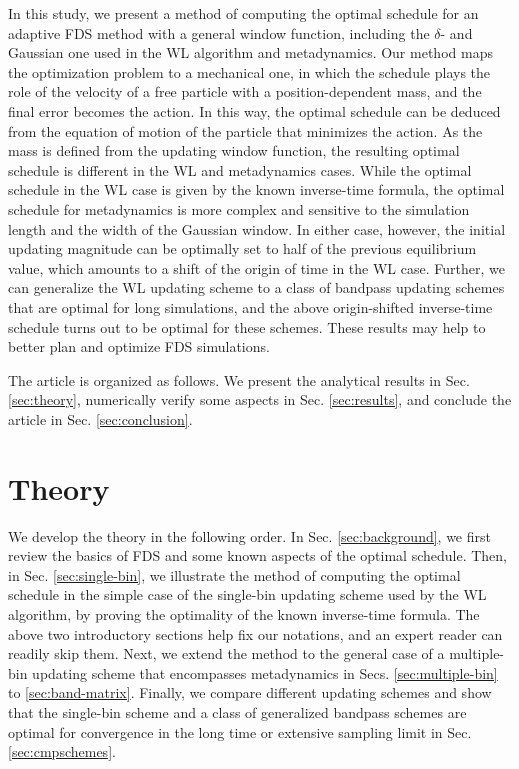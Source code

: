 \documentclass[reprint, superscriptaddress, floatfix]{revtex4-1}
\begin{document}
In this study,
we present a method of computing
the optimal schedule
for an adaptive FDS method
with a general window function,
including the $\delta$- and Gaussian one
used in the WL algorithm and metadynamics.
%
Our method maps the optimization problem to a mechanical one,
in which the schedule plays the role of the velocity of
a free particle with a position-dependent mass,
and the final error becomes the action.
%
In this way, the optimal schedule
can be deduced from the equation of motion
of the particle that minimizes the action.
%
As the mass is defined from the updating window function,
the resulting optimal schedule
is different in the WL and metadynamics cases.
%
While the optimal schedule in the WL case
is given by the known inverse-time formula,
the optimal schedule for metadynamics is more complex
and sensitive to the simulation length
and the width of the Gaussian window.
%
In either case, however,
the initial updating magnitude
can be optimally set to
half of the previous equilibrium value,
which amounts to a shift of the origin of time in the WL case.
%
Further, we can generalize
the WL updating scheme
to a class of bandpass updating schemes
that are optimal for long simulations,
and the above origin-shifted inverse-time schedule
turns out to be optimal for these schemes.
%
%
These results may help to better
plan and optimize FDS simulations.



The article is organized as follows.
%
We present the analytical results in Sec. \ref{sec:theory},
numerically verify some aspects
in Sec. \ref{sec:results},
and conclude the article
in Sec. \ref{sec:conclusion}.




\section{\label{sec:theory}
Theory}



We develop the theory
in the following order.
%
In Sec. \ref{sec:background},
we first review the basics of FDS
and some known aspects of the optimal schedule.
%
Then, in Sec. \ref{sec:single-bin},
we illustrate the method of
computing the optimal schedule
in the simple case of the
single-bin updating scheme
used by the WL algorithm,
by proving the optimality
of the known inverse-time formula.
%
The above two introductory sections help fix our notations,
and an expert reader can readily skip them.
%
Next, we extend the method to the general case
of a multiple-bin updating scheme
that encompasses metadynamics
in Secs. \ref{sec:multiple-bin}
to \ref{sec:band-matrix}.
%
Finally, we compare different updating schemes
and show that the single-bin scheme
and a class of generalized bandpass schemes
are optimal for convergence
in the long time or extensive sampling limit
in Sec. \ref{sec:cmpschemes}.
\end{document}
